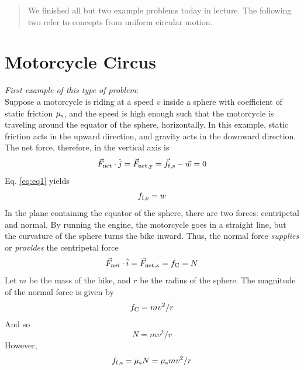 \documentclass[12pt]{article}
\begin{document}
\maketitle

\begin{abstract}
We finished all but two example problems today in lecture.  The following two refer to concepts from uniform circular motion.
\end{abstract}

\section{Motorcycle Circus}

\textit{First example of this type of problem}: \\
Suppose a motorcycle is riding at a speed $v$ inside a sphere with coefficient of static friction $\mu_{\rm s}$, and the speed is high enough such that the motorcycle is traveling around the equator of the sphere, horizontally.  In this example, static friction acts in the upward direction, and gravity acts in the downward direction.  The net force, therefore, in the vertical axis is
\begin{equation}
\vec{F}_{\rm net} \cdot \hat{j} = \vec{F}_{\rm net,y} = \vec{f}_{\rm f,s} - \vec{w} = 0
\label{eq:eq1}
\end{equation}
Eq. \ref{eq:eq1} yields
\begin{equation}
f_{\rm f,s} = w
\end{equation}
In the plane containing the equator of the sphere, there are two forces: centripetal and normal.  By running the engine, the motorcycle goes in a straight line, but the curvature of the sphere turns the bike inward.  Thus, the normal force \textit{supplies} or \textit{provides} the centripetal force
\begin{equation}
\vec{F}_{\rm net} \cdot \hat{i} = \vec{F}_{\rm net,x} = f_{\rm C} = N
\label{eq:eq2}
\end{equation}
Let $m$ be the mass of the bike, and $r$ be the radius of the sphere.  The magnitude of the normal force is given by
\begin{equation}
f_{\rm C} = mv^2/r
\end{equation}
And so
\begin{equation}
N = mv^2/r
\end{equation}
However,
\begin{equation}
f_{\rm f,s} = \mu_{\rm s} N = \mu_{\rm s} mv^2/r
\end{equation}
\end{document}
